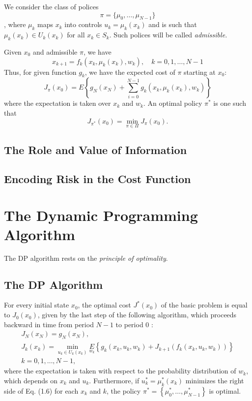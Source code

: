 We consider the class of polices 
$$\pi=\{\mu_0,\dots,\mu_{N-1}\}$$,
where $\mu_k$ maps $x_k$ into controls $u_k=\mu_k(x_k)$ and is such that $\mu_k(x_k)\in U_k(x_k)$ for all $x_k\in S_k$. Such polices will be called \textit{admissible.}

Given $x_0$ and admissible $\pi$, we have 
\begin{equation}\label{eq:1.1}
    x_{k+1}=f_k(x_k,\mu_k(x_k),w_k),\quad k=0,1,\dots,N-1
\end{equation}
Thus, for given function $g_k$, we have the expected cost of $\pi$ starting at $x_0$:
$$J_\pi(x_0)=E\left\{g_N(x_N)+\sum_{i=0}^{N-1}g_k(x_k,\mu_k(x_k),w_k)\right\}$$
where the expectation is taken over $x_k$ and $w_k$. An optimal policy $\pi^*$ is one such that 
$$J_{\pi^*}(x_0)=\min_{\pi\in\Pi}J_\pi(x_0).$$

\subsection*{The Role and Value of Information}
\subsection*{Encoding Risk in the Cost Function}

\section{The Dynamic Programming Algorithm}
The DP algorithm rests on the \textit{principle of optimality}. 
\subsection*{The DP Algorithm}
\begin{proposition}
For every initial state $x_0$, the optimal cost $J^*\left(x_0\right)$ of the basic problem is equal to $J_0\left(x_0\right)$, given by the last step of the following algorithm, which proceeds backward in time from period $N-1$ to period 0 :
$$
\begin{gathered}
J_N\left(x_N\right)=g_N\left(x_N\right), \\
J_k\left(x_k\right)=\min _{u_k \in U_k\left(x_k\right)} \underset{w_k}{E} \left\{g_k\left(x_k, u_k, w_k\right)+J_{k+1}\left(f_k\left(x_k, u_k, w_k\right)\right)\right\} \\
k=0,1, \ldots, N-1,
\end{gathered}
$$
where the expectation is taken with respect to the probability distribution of $w_k$, which depends on $x_k$ and $u_k$. Furthermore, if $u_k^*=\mu_k^*\left(x_k\right)$ minimizes the right side of Eq. (1.6) for each $x_k$ and $k$, the policy $\pi^*=\left\{\mu_0^*, \ldots, \mu_{N-1}^*\right\}$ is optimal.
\end{proposition}

